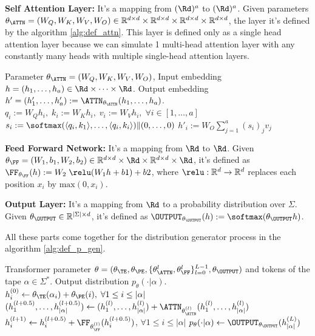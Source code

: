 \textbf{Self Attention Layer: } It's a mapping from $(\Rd)^a$ to $(\Rd)^a$. Given parameters $\theta_{\ATTN} = (W_Q, W_K , W_V , W_O) \in \mathbb{R}^{d \times d} \times \mathbb{R}^{d \times d} \times \mathbb{R}^{d \times d} \times \mathbb{R}^{d \times d}$, the layer it's defined by the algorithm \ref{alg:def_attn}. This layer is defined only as a single head attention layer because we can simulate 1 multi-head attention layer with any constantly many heads with multiple single-head attention layers. \cite{cookbook}

\begin{algorithm}
\caption{Causal Self-Attention, $\ATTN$}\label{alg:def_attn}
\begin{algorithmic}[1]
\Require  Parameter $\theta_\ATTN = (W_Q,W_K,W_V,W_O)$, Input embedding $h= (h_1,\ldots, h_a)\in\Rd \times \dots \times \Rd$.
\Ensure Output embedding $h'= (h'_1,\ldots, h'_a) := \ATTN_{\theta_\ATTN}(h_1,\ldots, h_a)$.
\State $q_i := W_Q  h_i, \; k_i := W_K h_i, \; v_i := W_V h_i, \; \forall i\in[1, \dots, a]$
\State $s_i := \softmax (\langle q_i, k_1 \rangle, \ldots, \langle q_i, k_i\rangle) \| (0,\ldots, 0) $
\State $h'_i := W_O \sum_{j=1}^a (s_i)_j v_j$
\end{algorithmic}
\end{algorithm}

\textbf{Feed Forward Network: } It's a mapping from $\Rd$ to $\Rd$. Given $\theta_{\FF} = (W_1 , b_1 , W_2 , b_2) \in \mathbb{R}^{d \times d} \times \Rd \times \mathbb{R}^{d \times d} \times \Rd$, it's defined as $\FF_{\theta_\FF}(h) := W_2 \; \relu(W_1 h + b1 ) + b2$, where $\relu: \mathbb{R}^d \to \mathbb{R}^d$ replaces each position $x_i$ by $\text{max}(0, x_i)$.

\textbf{Output Layer: } It's a mapping from $\Rd$ to a probability distribution over $\Sigma$. Given $\theta_{\OUTPUT} \in \mathbb{R}^{| \Sigma | \times d}$, it's defined as $\OUTPUT_{\theta_\OUTPUT}(h) := \softmax(\theta_\OUTPUT h)$.


All these parts come together for the distribution generator process in the algorithm \ref{alg:def_p_gen}.

\begin{algorithm}
\caption{Distribution generator}\label{alg:def_p_gen}
\begin{algorithmic}[1]
\Require   Transformer parameter $\theta = (\theta_\TE, \theta_\PE, \{\theta_\ATTN^{l}, \theta_\FF^{l}\}_{l=0}^{L-1}, \theta_\OUTPUT)$ and tokens of the tape $\alpha \in \Sigma^*$.
\Ensure Output distribution $p_\theta(\cdot | \alpha)$.
\State $h^{(0)}_i \gets \theta_\TE(\alpha_i) + \theta_\PE(i), \; \forall 1 \leq i \leq |\alpha|$
\State	$( h^{(l+0.5)}_1,\ldots, h^{(l+0.5)}_{|\alpha|}) \gets (h^{(l)}_1,\ldots, h^{(l)}_{|\alpha|}) +\ATTN_{\theta^{(l)}_\ATTN}(h^{(l)}_1,\ldots, h^{(l)}_{|\alpha|}) $
\State  $ h^{(l+1)}_i \gets  h^{(l+0.5)}_i + \FF_{\theta^{(l)}_\FF}(h^{(l+0.5)}_i)$, $\forall 1 \leq i \leq |\alpha|$
\EndFor
\State $p_\theta(\cdot| \alpha) \gets  \OUTPUT_{\theta_\OUTPUT}(h^{(L)}_{|\alpha|})$
\end{algorithmic}
\end{algorithm}



